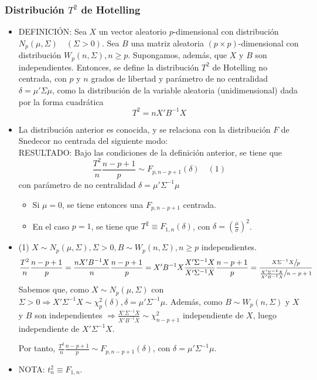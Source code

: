 \documentclass[11pt,a4paper]{article}
\begin{document}
\subsubsection{Distribución \texorpdfstring{$T^{2}$}) de Hotelling}
\begin{itemize}
\item DEFINICIÓN: Sea $X$ un vector aleatorio $p$-dimensional con distribución $N_{p}(\mu, \Sigma) \quad (\Sigma > 0)$. Sea $B$ una matriz aleatoria $(p \times p)$-dimensional con distribución $W_{p}(n, \Sigma), n \geq p$. Supongamos, además, que $X$ y $B$ son independientes. Entonces, se define la distribución $T^{2}$ de Hotelling no centrada, con $p$ y $n$ grados de libertad y parámetro de no centralidad $\delta = \mu'\Sigma\mu$, como la distribución de la variable aleatoria (unidimensional) dada por la forma cuadrática
$$T^{2} = nX'B^{-1}X$$

\item La distribución anterior es conocida, y se relaciona con la distribución $F$ de Snedecor no centrada del siguiente modo: \\
RESULTADO: Bajo las condiciones de la definición anterior, se tiene que
$$\frac{T^{2}}{n} \frac{n-p+1}{p} \sim F_{p, n-p+1}(\delta) \quad (1)$$
con parámetro de no centralidad $\delta = \mu'\Sigma^{-1}\mu$
\begin{itemize}
\item Si $\mu=0$, se tiene entonces una $F_{p, n-p+1}$ centrada.
\item En el caso $p=1$, se tiene que $T^{2} \equiv F_{1, n}(\delta)$, con $\delta = (\frac{\mu}{\sigma})^{2}$.
\end{itemize}

\item (1) $X \sim N_{p}(\mu, \Sigma), \Sigma > 0, B \sim W_{p}(n, \Sigma), n \geq p$ independientes.
$$\frac{T^{2}}{n} \frac{n-p+1}{p} = \frac{nX'B^{-1}X}{n} \frac{n-p+1}{p} = X'B^{-1}X \frac{X'\Sigma^{-1}X}{X'\Sigma^{-1}X} \frac{n-p+1}{p} = \frac{\sfrac{X\Sigma^{-1}X}{p}}{\sfrac{\frac{X'\Sigma^{-1}X}{X'B^{-1}X}}{n-p+1}}$$
Sabemos que, como $X \sim N_{p}(\mu, \Sigma)$ con $\Sigma > 0 \Rightarrow X'\Sigma^{-1}X \sim \chi^{2}_{p}(\delta), \delta = \mu'\Sigma^{-1}\mu$. Además, como $B \sim W_{p}(n, \Sigma)$ y $X$ y $B$ son independientes $\Rightarrow \frac{X'\Sigma^{-1}X}{X'B^{-1}X} \sim \chi_{n-p+1}^{2}$ independiente de $X$, luego independiente de $X'\Sigma^{-1}X$.

Por tanto, $\frac{T^{2}}{n}\frac{n-p+1}{p} \sim F_{p, n-p+1}(\delta)$, con $\delta = \mu'\Sigma^{-1}\mu$.

\item NOTA: $t_{n}^{2} \equiv F_{1, n}$.
\end{itemize}
\end{document}
